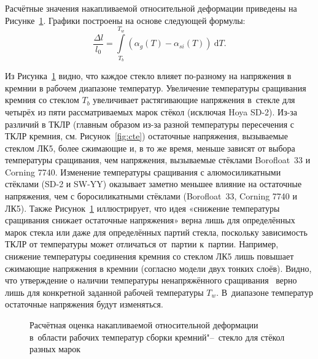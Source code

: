 Расчётные значения накапливаемой относительной деформации приведены на
Рисунке~\ref{fig:nakop_deform}.
Графики построены на основе следующей формулы:
\begin{equation}
    \label{eq:nakop_deform}
    \frac {\Delta l}{l_0}
    =
    \int\limits_{T_b}^{T_w}
    (
         \alpha_g(T) - \alpha_{si}(T)
    )
    \:\mathrm{d}T.
\end{equation}

Из Рисунка~\ref{fig:nakop_deform} видно, что каждое стекло влияет по-разному
на напряжения в кремнии в рабочем диапазоне температур. Увеличение температуры
сращивания кремния со стеклом \(T_b\) увеличивает растягивающие напряжения
в~стекле для четырёх из пяти рассматриваемых марок стёкол (исключая Hoya SD-2).
Из-за различий в ТКЛР (главным образом из-за разной температуры пересечения
с ТКЛР кремния, см. Рисунок~\ref{fig:cte}) остаточные напряжения, вызываемые
стеклом ЛК5, более сжимающие и, в то же время, меньше зависят от выбора
температуры сращивания, чем напряжения, вызываемые стёклами Borofloat~33 и
Corning 7740. Изменение температуры сращивания с алюмосиликатными стёклами (SD-2
и SW-YY) оказывает заметно меньшее влияние на остаточные напряжения, чем с
боросиликатными стёклами (Borofloat~33, Corning 7740 и ЛК5). Также
Рисунок~\ref{fig:nakop_deform} иллюстрирует, что идея «снижение температуры
сращивания снижает остаточные напряжения» верна лишь для определённых марок
стекла или даже для определённых партий стекла, поскольку зависимость ТКЛР от
температуры может отличаться от~партии к~партии. Например, снижение температуры
соединения кремния со стеклом ЛК5 лишь повышает сжимающие напряжения в кремнии
(согласно модели двух тонких слоёв). Видно, что утверждение о наличии
температуры ненапряжённого сращивания~\cite{Cozma_Puers_1995} верно лишь для
конкретной заданной рабочей температуры \(T_w\). В~диапазоне температур
остаточные напряжения будут изменяться.

\begin{figure}[!htb]%
    \centering

    \caption{Расчётная оценка накапливаемой относительной деформации в~области рабочих температур сборки кремний"--~стекло для стёкол разных марок}
    \label{fig:nakop_deform}
\end{figure}

